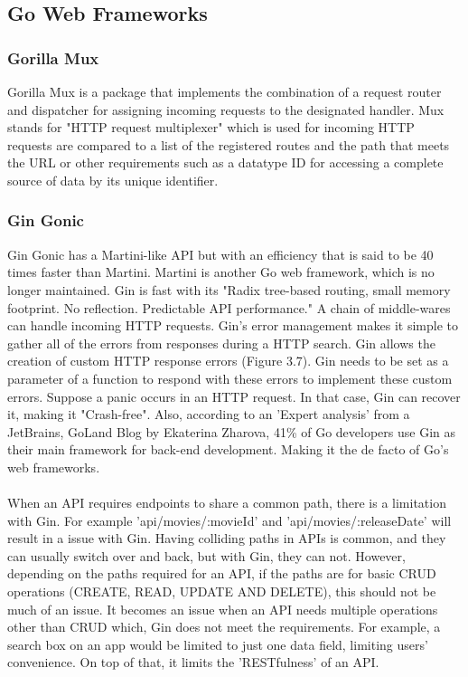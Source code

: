 \subsection{Go Web Frameworks}
\subsubsection{Gorilla Mux}
Gorilla Mux is a package that implements the combination of a request router and dispatcher for assigning incoming requests to the designated handler. Mux stands for "HTTP request multiplexer" which is used for incoming HTTP requests are compared to a list of the registered routes and the path that meets the URL or other requirements such as a datatype ID for accessing a complete source of data by its unique identifier. \cite{ref11}

\subsubsection{Gin Gonic}
Gin Gonic has a Martini-like API but with an efficiency that is said to be 40 times faster than Martini. Martini is another Go web framework, which is no longer maintained. Gin is fast with its "Radix tree-based routing, small memory footprint. No reflection. Predictable API performance." \cite{ref12} A chain of middle-wares can handle incoming HTTP requests. Gin's error management makes it simple to gather all of the errors from responses during a HTTP search. Gin allows the creation of custom HTTP response errors (Figure 3.7). Gin needs to be set as a parameter of a function to respond with these errors to implement these custom errors. Suppose a panic occurs in an HTTP request. In that case, Gin can recover it, making it "Crash-free". \cite{ref12} Also, according to an 'Expert analysis' from a JetBrains, GoLand Blog by Ekaterina Zharova, 41\% of Go developers use Gin as their main framework for back-end development. \cite{ref13} Making it the de facto of Go's web frameworks.
\\\\ When an API requires endpoints to share a common path, there is a limitation with Gin. For example 'api/movies/:movieId' and 'api/movies/:releaseDate' will result in a issue with Gin. Having colliding paths in APIs is common, and they can usually switch over and back, but with Gin, they can not. However, depending on the paths required for an API, if the paths are for basic CRUD operations (CREATE, READ, UPDATE AND DELETE), this should not be much of an issue. It becomes an issue when an API needs multiple operations other than CRUD which, Gin does not meet the requirements. For example, a search box on an app would be limited to just one data field, limiting users' convenience. On top of that, it limits the 'RESTfulness' of an API.

